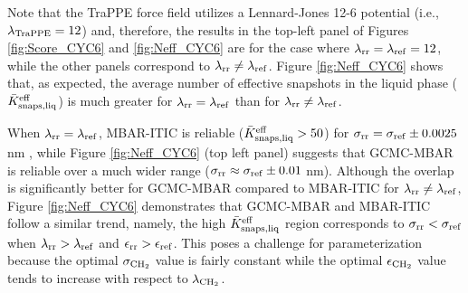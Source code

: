 \documentclass[journal=jced,manuscript=article]{achemso}
\begin{document}



Note that the TraPPE force field utilizes a Lennard-Jones 12-6 potential (i.e., $\lambda_{\rm TraPPE} = 12$) and, therefore, the results in the top-left panel of Figures \ref{fig:Score_CYC6} and \ref{fig:Neff_CYC6} are for the case where $\lambda_{\rm rr} = \lambda_{\rm ref} = 12$, while the other panels correspond to $\lambda_{\rm rr} \neq \lambda_{\rm ref}$. Figure \ref{fig:Neff_CYC6} shows that, as expected, the average number of effective snapshots in the liquid phase ($\bar K_{\rm snaps, liq}^{\rm eff}$) is much greater for $\lambda_{\rm rr} = \lambda_{\rm ref}$ than for $\lambda_{\rm rr} \neq \lambda_{\rm ref}$. 

When $\lambda_{\rm rr} = \lambda_{\rm ref}$, MBAR-ITIC is reliable ($\bar K_{\rm snaps, liq}^{\rm eff} > 50$) for $\sigma_{\rm rr} = \sigma_{\rm ref} \pm 0.0025$ nm \cite{Postdoc_1}, while Figure \ref{fig:Neff_CYC6} (top left panel) suggests that GCMC-MBAR is reliable over a much wider range ($\sigma_{\rm rr} \approx \sigma_{\rm ref} \pm 0.01$ nm). Although the overlap is significantly better for GCMC-MBAR compared to MBAR-ITIC for $\lambda_{\rm rr} \neq \lambda_{\rm ref}$, Figure \ref{fig:Neff_CYC6} demonstrates that GCMC-MBAR and MBAR-ITIC follow a similar trend, namely, the high $\bar K_{\rm snaps, liq}^{\rm eff}$ region corresponds to $\sigma_{\rm rr} < \sigma_{\rm ref}$ when $\lambda_{\rm rr} > \lambda_{\rm ref}$ and $\epsilon_{\rm rr} > \epsilon_{\rm ref}$. This poses a challenge for parameterization because the optimal $\sigma_{\rm CH_2}$ value is fairly constant while the optimal $\epsilon_{\rm CH_2}$ value tends to increase with respect to $\lambda_{\rm CH_2}$.

\end{document}
